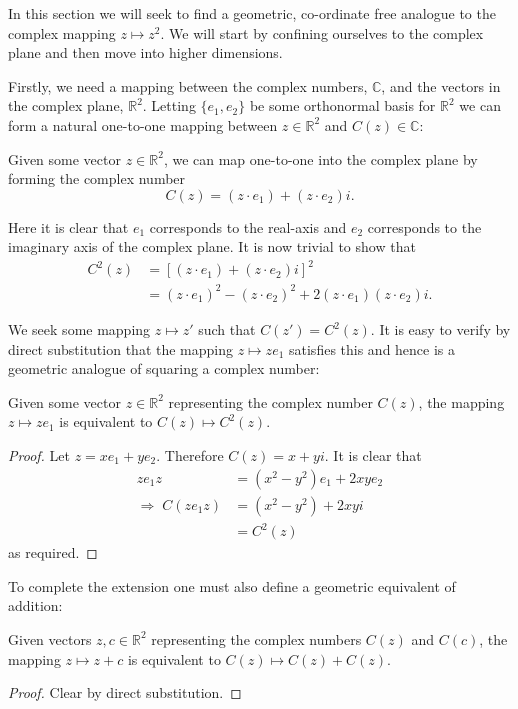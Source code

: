 In this section we will seek to find a geometric, co-ordinate free
analogue to the complex mapping $z \mapsto z^2$. We will start by 
confining ourselves to the complex plane and then move into higher dimensions.

Firstly, we need a mapping between the complex numbers, $\mathbb{C}$, and
the vectors in the complex plane, $\mathbb{R}^2$. Letting $\{e_1, e_2\}$
be some orthonormal basis for $\mathbb{R}^2$ we can form a natural
one-to-one mapping between $z \in \mathbb{R}^2$ and $C(z) \in \mathbb{C}$:

\begin{definition}
Given some vector $z \in \mathbb{R}^2$, we can map one-to-one into the
complex plane by forming the complex number
\[
C(z) = (z \cdot e_1) + (z \cdot e_2)i.
\]
\end{definition}

Here it is clear that $e_1$ corresponds to the real-axis and $e_2$ 
corresponds to the imaginary axis of the complex plane.
It is now trivial to show that
\begin{align*}
C^2(z) &= [(z \cdot e_1) + (z \cdot e_2)i]^2 \\
       &= (z \cdot e_1)^2 - (z \cdot e_2)^2 + 2(z \cdot e_1)(z \cdot e_2)i.
\end{align*}

We seek some mapping $z \mapsto z'$ such that $C(z') = C^2(z)$. It is 
easy to verify by direct substitution that the mapping 
$z \mapsto ze_1$ satisfies this and hence is a geometric analogue of 
squaring a complex number:

\begin{lemma}
Given some vector $z \in \mathbb{R}^2$ representing the complex number
$C(z)$, the mapping $z \mapsto ze_1$ is equivalent to $C(z) \mapsto C^2(z)$.
\end{lemma}
\begin{proof}
Let $z = xe_1 + ye_2$. Therefore $C(z) = x + yi$. It is clear that
\begin{align*}
ze_1z &= (x^2 - y^2) e_1 + 2xye_2 \\
\Rightarrow\;C(ze_1z) &= (x^2 - y^2) + 2xyi\\
        &= C^2(z)
\end{align*}
as required.
\end{proof}

To complete the extension one must also define a geometric equivalent of
addition:
\begin{lemma}
Given vectors $z, c \in \mathbb{R}^2$ representing the complex numbers
$C(z)$ and $C(c)$, the mapping $z \mapsto z + c$ is equivalent to 
$C(z) \mapsto C(z) + C(z)$.
\end{lemma}
\begin{proof}
Clear by direct substitution.
\end{proof}

